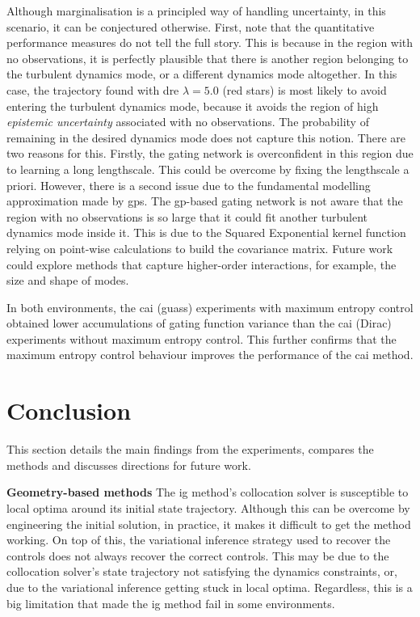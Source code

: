 \documentclass{mimosis-class/mimosis}
\numberwithin{equation}{chapter}
\begin{document}
{Although marginalisation is a principled way of handling uncertainty, in this scenario,
it can be conjectured otherwise.
First, note that the quantitative performance measures do not tell the full story.
This is because in the region with no observations, it is perfectly plausible that there
is another region belonging to the turbulent dynamics mode, or a different dynamics mode altogether.
In this case, the trajectory found with \acrshort{dre} \(\lambda=5.0\) (red stars) is most likely to
avoid entering the turbulent dynamics mode, because it avoids the region of
high \emph{epistemic uncertainty} associated with no observations.
The probability of remaining in the desired dynamics mode does not capture this notion.
There are two reasons for this.
Firstly, the gating network is overconfident in this region due to learning a long lengthscale.
This could be overcome by fixing the lengthscale a priori.
However, there is a second issue due to the fundamental modelling approximation made by \acrshort{gps}.
The \acrshort{gp}-based gating network is not aware that the region with no observations is so large that it could fit
another turbulent dynamics mode inside it.
This is due to the Squared Exponential kernel function relying on point-wise calculations to build the covariance
matrix.
Future work could explore methods that capture higher-order interactions, for example, the size and shape of
modes.

In both environments, the \acrshort{cai} (guass) experiments with maximum entropy control obtained lower
accumulations of gating function variance than the \acrshort{cai} (Dirac) experiments without maximum entropy control.
This further confirms that the maximum entropy control behaviour improves the performance of the \acrshort{cai}
method.

\section{Conclusion}
\label{sec:orgc885cad}
This section details the main findings from the experiments, compares the methods
and discusses directions for future work.

\textbf{Geometry-based methods}
The \acrshort{ig} method's collocation solver is susceptible to local optima around
its initial state trajectory.
Although this can be overcome by engineering the initial solution, in practice, it makes it difficult to
get the method working.
On top of this, the variational inference strategy used to recover the controls does not always recover the correct controls.
This may be due to the collocation solver's state trajectory not satisfying the dynamics constraints, or,
due to the variational inference getting stuck in local optima.
Regardless, this is a big limitation that made the \acrshort{ig} method fail in some environments.

}
\end{document}
